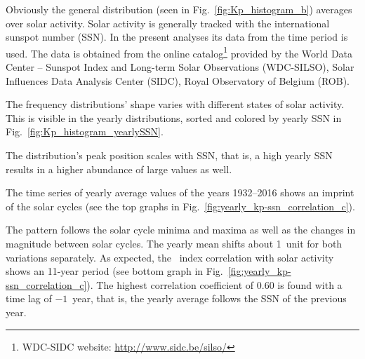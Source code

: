 Obviously the general \Kp{} distribution (seen in Fig.~\ref{fig:Kp_histogram_b}) averages over solar activity. Solar activity is generally tracked with the international sunspot number (SSN). In the present analyses its data from the time period \citeyear{sidc1917} is used. The data is obtained from the online catalog\footnote{WDC-SIDC website: \url{http://www.sidc.be/silso/}} provided by the World Data Center -- Sunspot Index and Long-term Solar Observations (WDC-SILSO), Solar Influences Data Analysis Center (SIDC), Royal Observatory of Belgium (ROB).

The \Kp{} frequency distributions' shape varies with different states of solar activity. This is visible in the yearly distributions, sorted and colored by yearly SSN in Fig.~\ref{fig:Kp_histogram_yearlySSN}.

The distribution's peak position scales with SSN, that is, a high yearly SSN results in a higher abundance of large \Kp{} values as well.

The time series of yearly average \Kp{} values of the years 1932--2016 shows an imprint of the solar cycles (see the top graphs in Fig.~\ref{fig:yearly_kp-ssn_correlation_c}).
\begin{figure}
\end{figure}
The \Kp{} pattern follows the solar cycle minima and maxima as well as the changes in magnitude between solar cycles. The yearly mean \Kp{} shifts about 1~unit for both variations separately. As expected, the \Kp{}~index correlation with solar activity shows an 11-year period (see bottom graph in Fig.~\ref{fig:yearly_kp-ssn_correlation_c}). The highest correlation coefficient of 0.60 is found with a time lag of $-1$~year, that is, the yearly average \Kp{} follows the SSN of the previous year.

